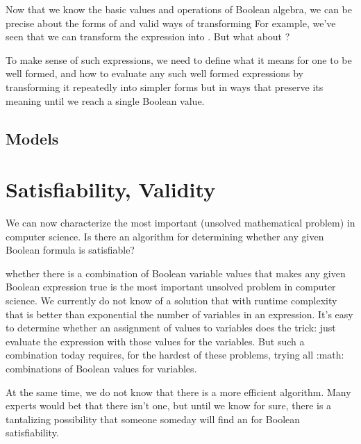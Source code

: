 \documentclass[letterpaper,10pt,english]{sphinxmanual}
\begin{document}
Now that we know the basic values and operations of Boolean algebra,
we can be precise about the forms of and valid ways of transforming
 For example, we’ve seen that we can transform
the expression  into . But what about ?

To make sense of such expressions, we need to define what it means for
one to be well formed, and how to evaluate any such well formed
expressions by transforming it repeatedly into simpler forms but in
ways that preserve its meaning until we reach a single Boolean value.


\subsection{Models}
\label{\detokenize{09-propositional-logic:models}}

\section{Satisfiability, Validity}
\label{\detokenize{09-propositional-logic:satisfiability-validity}}
We can now characterize the most important  (unsolved
mathematical problem) in computer science.  Is there an 
algorithm for determining whether any given Boolean formula is
satisfiable?

whether there is a combination of Boolean
variable values that makes any given Boolean expression true is the
most important unsolved problem in computer science. We currently do
not know of a solution that with runtime complexity that is better
than exponential the number of variables in an expression.  It’s easy
to determine whether an assignment of values to variables does the
trick: just evaluate the expression with those values for the
variables. But  such a combination today requires, for the
hardest of these problems, trying all :math: combinations of
Boolean values for  variables.

At the same time, we do not know that there is  a more efficient
algorithm. Many experts would bet that there isn’t one, but until we
know for sure, there is a tantalizing possibility that someone someday
will find an  for Boolean satisfiability.
\end{document}

